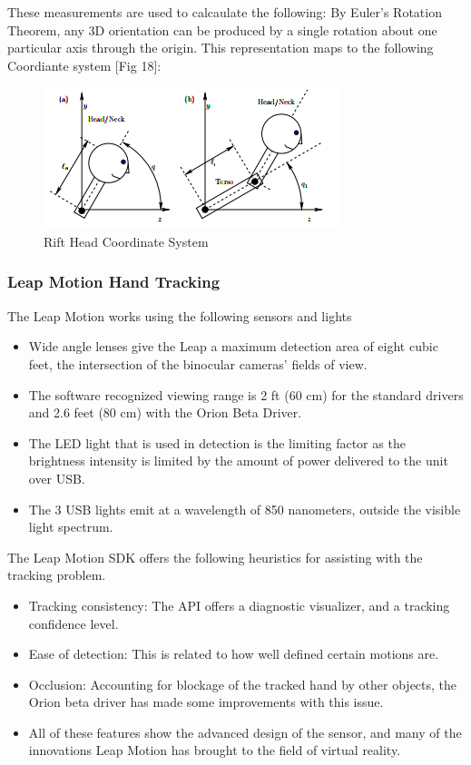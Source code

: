 \documentclass[a4paper,10pt]{article}
\begin{document}
These measurements are used to calcaulate the following:
By Euler’s Rotation Theorem, any 3D orientation can
be produced by a single rotation about one particular axis
through the origin. This representation maps to the following Coordiante system [Fig 18]:
 \begin{figure}[H]
	\centerline{\includegraphics[scale=0.7]{riftHead.png}}
	\caption{Rift Head Coordinate System}
	\label{fig:magnets2}
	\end{figure}
 \pagebreak
\subsubsection{Leap Motion Hand Tracking}
The Leap Motion works using the following sensors and lights \cite{leapProc}
\begin{itemize}
 \item Wide angle lenses give the Leap a maximum detection area of eight cubic feet, the intersection of the binocular cameras’ fields of view. 
 \item The software recognized viewing range is 2 ft (60 cm) for the standard drivers and 2.6 feet (80 cm) with the Orion Beta Driver. 
 \item The LED light that is used in detection is the limiting factor as the brightness intensity is limited by the amount of power delivered to the unit
 over USB.
 \item The 3 USB lights emit at a wavelength of 850 nanometers, outside the visible light spectrum.
\end{itemize}

The Leap Motion SDK offers the following heuristics for assisting with the tracking problem.\cite{leapHeuristics}
\begin{itemize}
 \item Tracking consistency:  The API offers a diagnostic visualizer, and a tracking confidence level.
 \item Ease of detection: This is related to how well defined certain motions are. 
 \item Occlusion: Accounting for blockage of the tracked hand by other objects, the Orion beta driver has made some improvements with this issue.
 \item All of these features show the advanced design of the sensor, and many of the innovations Leap Motion has brought to the field of virtual reality. 
\end{itemize}
\end{document}
